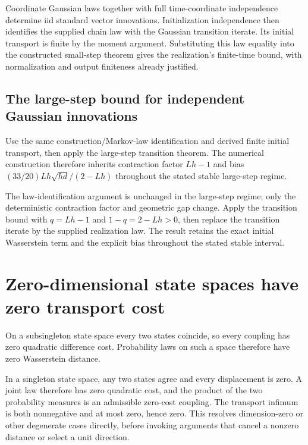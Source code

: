 \documentclass[11pt,a4paper]{report}
\begin{document}
Coordinate Gaussian laws together with full time-coordinate independence determine iid standard vector innovations. Initialization independence then identifies the supplied chain law with the Gaussian transition iterate. Its initial transport is finite by the moment argument. Substituting this law equality into the constructed small-step theorem gives the realization's finite-time bound, with normalization and output finiteness already justified.

\subsection{\texorpdfstring{The large-step bound for independent Gaussian innovations}{The large-step bound for independent Gaussian innovations}}
\label{report-step-UnadjustedLangevin-GaussianULA-lean-4}


Use the same construction/\allowbreak{}Markov-law identification and derived finite initial transport, then apply the large-step transition theorem. The numerical construction therefore inherits contraction factor \(Lh-1\) and bias \((33/20)Lh\sqrt{hd}/(2-Lh)\) throughout the stated stable large-step regime.



The law-identification argument is unchanged in the large-step regime; only the deterministic contraction factor and geometric gap change. Apply the transition bound with \(q=Lh-1\) and \(1-q=2-Lh>0\), then replace the transition iterate by the supplied realization law. The result retains the exact initial Wasserstein term and the explicit bias throughout the stated stable interval.

\section{\texorpdfstring{Zero-dimensional state spaces have zero transport cost}{Zero-dimensional state spaces have zero transport cost}}
\label{proof-module-UnadjustedLangevin-Degenerate-lean}


On a subsingleton state space every two states coincide, so every coupling has zero quadratic difference cost. Probability laws on such a space therefore have zero Wasserstein distance.



In a singleton state space, any two states agree and every displacement is zero. A joint law therefore has zero quadratic cost, and the product of the two probability measures is an admissible zero-cost coupling. The transport infimum is both nonnegative and at most zero, hence zero. This resolves dimension-zero or other degenerate cases directly, before invoking arguments that cancel a nonzero distance or select a unit direction.
\end{document}
